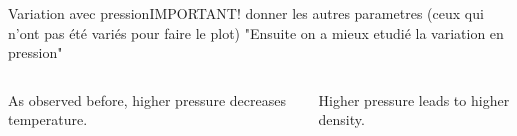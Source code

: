 \documentclass[10pt]{beamer}
\begin{document}
\begin{frame}{Variation avec pression}{IMPORTANT! donner les autres parametres (ceux qui n'ont pas été variés pour faire le plot)}
    "Ensuite on a mieux etudié la variation en pression"
    \begin{columns}
        \centering

        As observed before, higher pressure decreases temperature.

        \centering
        Higher pressure leads to higher density.

    \end{columns}
\end{frame}
\end{document}
